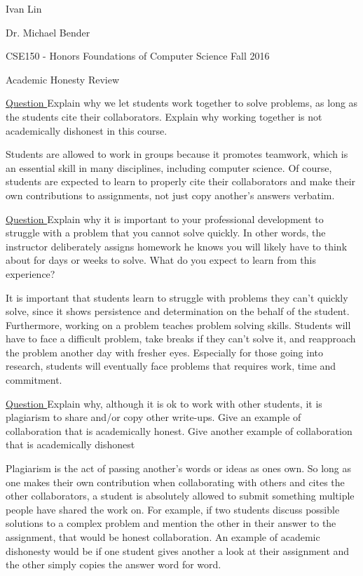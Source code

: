 \documentclass[a4paper]{article}
\begin{document}
Ivan Lin

Dr. Michael Bender

CSE150 - Honors Foundations of Computer Science Fall 2016

Academic Honesty Review
\newline
{}


\underline{Question }
Explain why we let students work together to solve problems, as long as the students cite their collaborators. Explain why working together is not academically dishonest in this course.

Students are allowed to work in groups because it promotes teamwork, which is an essential skill in many disciplines, including computer science. Of course, students are expected to learn to properly cite their collaborators and make their own contributions to assignments, not just copy another's answers verbatim. 


\underline{Question }
Explain why it is important to your professional development to struggle with a problem that you cannot solve quickly. In other words, the instructor deliberately assigns homework he knows you will likely have to think about for days or weeks to solve. What do you expect to learn from this
experience?

It is important that students learn to struggle with problems they can't quickly solve, since it shows persistence and determination on the behalf of the student. Furthermore, working on a problem teaches problem solving skills. Students will have to face a difficult problem, take breaks if they can't solve it, and reapproach the problem another day with fresher eyes. Especially for those going into research, students will eventually face problems that requires work, time and commitment. 


\underline{Question }
Explain why, although it is ok to work with other students, it is plagiarism to share and/or copy other write-ups. Give an example of collaboration that is academically honest. Give another example of collaboration that is academically dishonest

Plagiarism is the act of passing another's words or ideas as ones own. So long as one makes their own contribution when collaborating with others and cites the other collaborators, a student is absolutely allowed to submit something multiple people have shared the work on. For example, if two students discuss possible solutions to a complex problem and mention the other in their answer to the assignment, that would be honest collaboration. An example of academic dishonesty would be if one student gives another a look at their assignment and the other simply copies the answer word for word.
\end{document}

